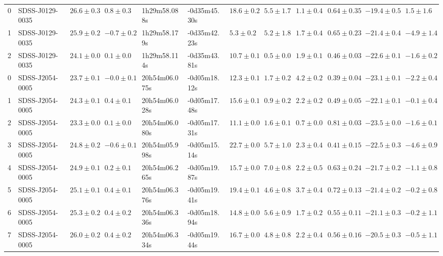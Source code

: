 \begin{tabular}{llllllllllll}
0 &   SDSS-J0129-0035 &  $26.6\pm0.3$ &   $0.8\pm0.3$ &   1h29m58.088s &  -0d35m45.30s &  $18.6\pm0.2$ &  $5.5\pm1.7$ &  $1.1\pm0.4$ &  $0.64\pm0.35$ &  $-19.4\pm0.5$ &   $1.5\pm1.6$ \\
1 &   SDSS-J0129-0035 &  $25.9\pm0.2$ &  $-0.7\pm0.2$ &   1h29m58.179s &  -0d35m42.23s &   $5.3\pm0.2$ &  $5.2\pm1.8$ &  $1.7\pm0.4$ &  $0.65\pm0.23$ &  $-21.4\pm0.4$ &  $-4.9\pm1.4$ \\
2 &   SDSS-J0129-0035 &  $24.1\pm0.0$ &   $0.1\pm0.0$ &   1h29m58.114s &  -0d35m43.81s &  $10.7\pm0.1$ &  $0.5\pm0.0$ &  $1.9\pm0.1$ &  $0.46\pm0.03$ &  $-22.6\pm0.1$ &  $-1.6\pm0.2$ \\
0 &   SDSS-J2054-0005 &  $23.7\pm0.1$ &  $-0.0\pm0.1$ &  20h54m06.075s &  -0d05m18.12s &  $12.3\pm0.1$ &  $1.7\pm0.2$ &  $4.2\pm0.2$ &  $0.39\pm0.04$ &  $-23.1\pm0.1$ &  $-2.2\pm0.4$ \\
1 &   SDSS-J2054-0005 &  $24.3\pm0.1$ &   $0.4\pm0.1$ &  20h54m06.028s &  -0d05m17.48s &  $15.6\pm0.1$ &  $0.9\pm0.2$ &  $2.2\pm0.2$ &  $0.49\pm0.05$ &  $-22.1\pm0.1$ &  $-0.1\pm0.4$ \\
2 &   SDSS-J2054-0005 &  $23.3\pm0.0$ &   $0.1\pm0.0$ &  20h54m06.080s &  -0d05m17.31s &  $11.1\pm0.0$ &  $1.6\pm0.1$ &  $0.7\pm0.0$ &  $0.81\pm0.03$ &  $-23.5\pm0.0$ &  $-1.6\pm0.1$ \\
3 &   SDSS-J2054-0005 &  $24.8\pm0.2$ &  $-0.6\pm0.1$ &  20h54m05.998s &  -0d05m15.14s &  $22.7\pm0.0$ &  $5.7\pm1.0$ &  $2.3\pm0.4$ &  $0.41\pm0.15$ &  $-22.5\pm0.3$ &  $-4.6\pm0.9$ \\
4 &   SDSS-J2054-0005 &  $24.9\pm0.1$ &   $0.2\pm0.1$ &  20h54m06.265s &  -0d05m19.87s &  $15.7\pm0.0$ &  $7.0\pm0.8$ &  $2.2\pm0.5$ &  $0.63\pm0.24$ &  $-21.7\pm0.2$ &  $-1.1\pm0.8$ \\
5 &   SDSS-J2054-0005 &  $25.1\pm0.1$ &   $0.4\pm0.1$ &  20h54m06.376s &  -0d05m19.41s &  $19.4\pm0.1$ &  $4.6\pm0.8$ &  $3.7\pm0.4$ &  $0.72\pm0.13$ &  $-21.4\pm0.2$ &  $-0.2\pm0.8$ \\
6 &   SDSS-J2054-0005 &  $25.3\pm0.2$ &   $0.4\pm0.2$ &  20h54m06.336s &  -0d05m18.94s &  $14.8\pm0.0$ &  $5.6\pm0.9$ &  $1.7\pm0.2$ &  $0.55\pm0.11$ &  $-21.1\pm0.3$ &  $-0.2\pm1.1$ \\
7 &   SDSS-J2054-0005 &  $26.0\pm0.2$ &   $0.4\pm0.2$ &  20h54m06.334s &  -0d05m19.44s &  $16.7\pm0.0$ &  $4.8\pm0.8$ &  $2.2\pm0.4$ &  $0.56\pm0.16$ &  $-20.5\pm0.3$ &  $-0.5\pm1.1$ \\
\bottomrule
\end{tabular}
